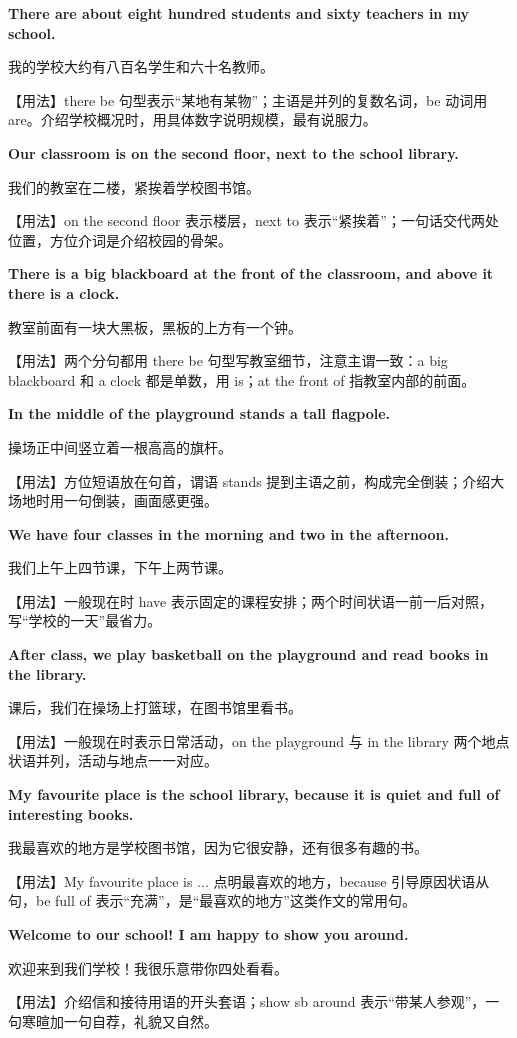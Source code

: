 \documentclass[UTF8,a4paper,11pt,oneside]{ctexbook}
\newcommand{\fansection}[1]{%
  \par\addvspace{2.4ex}%
  \Needspace{6\baselineskip}%
  \noindent{\sffamily\Large\bfseries\color{mainblue}#1}\par
  \nopagebreak
  \addvspace{0.2ex}%
  \noindent{\color{rulelight}\rule{\linewidth}{0.9pt}}\par
  \addvspace{0.9ex}%
  \nobreak
}
\newcommand{\fanpat}[3]{%
  \item{\bfseries #1}\par\nopagebreak
  {\small\color{textgray}#2}\par\nopagebreak
  {\footnotesize\color{accent!90!black}【用法】#3}\par
}
\begin{document}
\fansection{〇、本单元写作常用句型}
\begin{fanpatterns}
\fanpat{There are about eight hundred students and sixty teachers in my school.}{我的学校大约有八百名学生和六十名教师。}{there be 句型表示“某地有某物”；主语是并列的复数名词，be 动词用 are。介绍学校概况时，用具体数字说明规模，最有说服力。}

\fanpat{Our classroom is on the second floor, next to the school library.}{我们的教室在二楼，紧挨着学校图书馆。}{on the second floor 表示楼层，next to 表示“紧挨着”；一句话交代两处位置，方位介词是介绍校园的骨架。}

\fanpat{There is a big blackboard at the front of the classroom, and above it there is a clock.}{教室前面有一块大黑板，黑板的上方有一个钟。}{两个分句都用 there be 句型写教室细节，注意主谓一致：a big blackboard 和 a clock 都是单数，用 is；at the front of 指教室内部的前面。}

\fanpat{In the middle of the playground stands a tall flagpole.}{操场正中间竖立着一根高高的旗杆。}{方位短语放在句首，谓语 stands 提到主语之前，构成完全倒装；介绍大场地时用一句倒装，画面感更强。}

\fanpat{We have four classes in the morning and two in the afternoon.}{我们上午上四节课，下午上两节课。}{一般现在时 have 表示固定的课程安排；两个时间状语一前一后对照，写“学校的一天”最省力。}

\fanpat{After class, we play basketball on the playground and read books in the library.}{课后，我们在操场上打篮球，在图书馆里看书。}{一般现在时表示日常活动，on the playground 与 in the library 两个地点状语并列，活动与地点一一对应。}

\fanpat{My favourite place is the school library, because it is quiet and full of interesting books.}{我最喜欢的地方是学校图书馆，因为它很安静，还有很多有趣的书。}{My favourite place is ... 点明最喜欢的地方，because 引导原因状语从句，be full of 表示“充满”，是“最喜欢的地方”这类作文的常用句。}

\fanpat{Welcome to our school! I am happy to show you around.}{欢迎来到我们学校！我很乐意带你四处看看。}{介绍信和接待用语的开头套语；show sb around 表示“带某人参观”，一句寒暄加一句自荐，礼貌又自然。}

\end{fanpatterns}

\fansection{一、满分范文}
\end{document}
